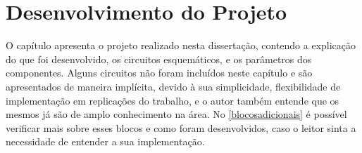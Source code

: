 \chapter[Desenvolvimento do Projeto]{Desenvolvimento do Projeto}

O capítulo apresenta o projeto realizado nesta dissertação, contendo a explicação do que foi desenvolvido, os circuitos esquemáticos, e os parâmetros dos componentes. Alguns circuitos não foram incluídos neste capítulo e são apresentados de maneira implícita, devido à sua simplicidade, flexibilidade de implementação em replicações do trabalho, e o autor também entende que os mesmos já são de amplo conhecimento na área. No \autoref{blocosadicionais} é possível verificar mais sobre esses blocos e como foram desenvolvidos, caso o leitor sinta a necessidade de entender a sua implementação.

\newcommand{\NomeBloco}{NULL}
\newcommand{\NomeBlocoNoIt}{NULL}
\newcommand{\NomeBlocoNoUnderline}{NULL}
\newcommand{\NomePTab}{tab_\NomeBlocoNoUnderline}
\newcommand{\NomeSTab}{tab_\NomeBlocoNoUnderline2}
\newcommand{\NomePFig}{fig_\NomeBlocoNoUnderline}
\newcommand{\NomeSFig}{fig_\NomeBlocoNoUnderline2}
\newcommand{\NomeTTab}{tab_\NomeBlocoNoUnderline3}
\newcommand{\NomeQTab}{tab_\NomeBlocoNoUnderline4}












